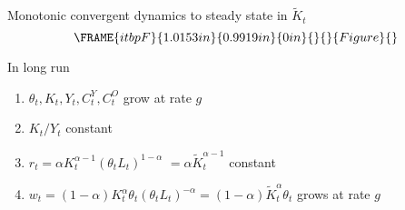 \documentclass[notes=show]{beamer}
\begin{document}
\begin{frame}%


Monotonic convergent dynamics to steady state in $\tilde{K}_{t}$ 
\begin{equation*}
\FRAME{itbpF}{1.0153in}{0.9919in}{0in}{}{}{Figure}{\special{language
"Scientific Word";type "GRAPHIC";maintain-aspect-ratio TRUE;display
"USEDEF";valid_file "T";width 1.0153in;height 0.9919in;depth
0in;original-width 6.5829in;original-height 6.4307in;cropleft "0";croptop
"1";cropright "1";cropbottom "0";tempfilename
'PEZU5W07.bmp';tempfile-properties "XPR";}}
\end{equation*}

In long run

\begin{enumerate}
\item $\theta _{t},K_{t},Y_{t},C_{t}^{Y},C_{t}^{O}$ grow at rate $g$

\item $K_{t}/Y_{t}$ constant

\item $r_{t}=\alpha K_{t}^{\alpha -1}\left( \theta _{t}L_{t}\right)
^{1-\alpha }$ $=\alpha \tilde{K}_{t}^{\alpha -1}$ constant

\item $w_{t}=\left( 1-\alpha \right) K_{t}^{\alpha }\theta _{t}\left( \theta
_{t}L_{t}\right) ^{-\alpha }=\left( 1-\alpha \right) \tilde{K}_{t}^{\alpha
}\theta _{t}$ grows at rate $g$
\end{enumerate}

\transboxout%
\end{frame}%
\end{document}
